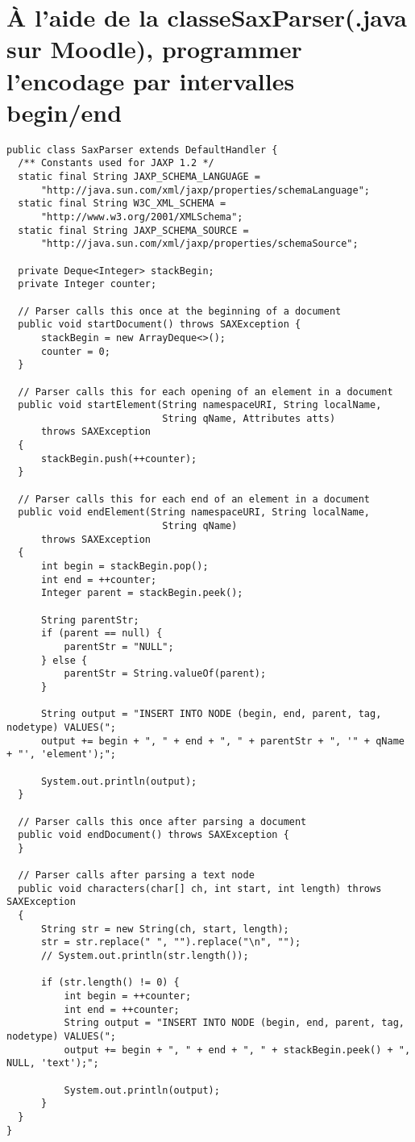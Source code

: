 \section{À l’aide de la classeSaxParser(.java sur Moodle), programmer l’encodage par intervalles begin/end}
\begin{verbatim}
public class SaxParser extends DefaultHandler {
  /** Constants used for JAXP 1.2 */
  static final String JAXP_SCHEMA_LANGUAGE =
      "http://java.sun.com/xml/jaxp/properties/schemaLanguage";
  static final String W3C_XML_SCHEMA =
      "http://www.w3.org/2001/XMLSchema";
  static final String JAXP_SCHEMA_SOURCE =
      "http://java.sun.com/xml/jaxp/properties/schemaSource";

  private Deque<Integer> stackBegin;
  private Integer counter;
  
  // Parser calls this once at the beginning of a document
  public void startDocument() throws SAXException {
      stackBegin = new ArrayDeque<>();
      counter = 0;
  }

  // Parser calls this for each opening of an element in a document
  public void startElement(String namespaceURI, String localName,
                           String qName, Attributes atts)
      throws SAXException
  {
      stackBegin.push(++counter);
  }
  
  // Parser calls this for each end of an element in a document
  public void endElement(String namespaceURI, String localName,
                           String qName)
      throws SAXException
  {
      int begin = stackBegin.pop();
      int end = ++counter;
      Integer parent = stackBegin.peek();

      String parentStr;
      if (parent == null) {
          parentStr = "NULL";
      } else {
          parentStr = String.valueOf(parent);
      }
      
      String output = "INSERT INTO NODE (begin, end, parent, tag, nodetype) VALUES(";
      output += begin + ", " + end + ", " + parentStr + ", '" + qName + "', 'element');";
      
      System.out.println(output);
  }
  
  // Parser calls this once after parsing a document
  public void endDocument() throws SAXException {
  }

  // Parser calls after parsing a text node
  public void characters(char[] ch, int start, int length) throws SAXException
  {
      String str = new String(ch, start, length);
      str = str.replace(" ", "").replace("\n", "");    
      // System.out.println(str.length());

      if (str.length() != 0) {
          int begin = ++counter;
          int end = ++counter;
          String output = "INSERT INTO NODE (begin, end, parent, tag, nodetype) VALUES(";
          output += begin + ", " + end + ", " + stackBegin.peek() + ", NULL, 'text');";

          System.out.println(output);
      }
  }
}
\end{verbatim}

